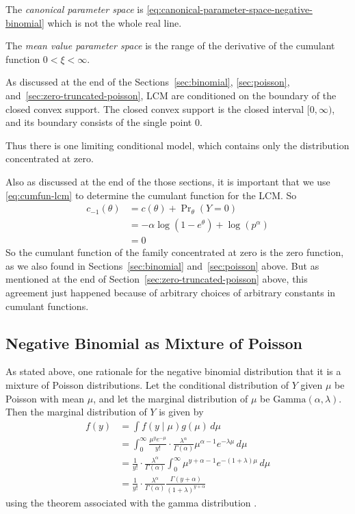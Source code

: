 The \emph{canonical parameter space}
is \eqref{eq:canonical-parameter-space-negative-binomial}
which is not the whole real line.

The \emph{mean value parameter space} is the range of the derivative of
the cumulant function $0 < \xi < \infty$.

As discussed at the end of the Sections~\ref{sec:binomial},
\ref{sec:poisson}, and~\ref{sec:zero-truncated-poisson}, LCM
are conditioned on the boundary of the closed convex support.
The closed convex support is the closed interval $[0, \infty)$, and its
boundary consists of the single point $0$.

Thus there is one limiting conditional model, which contains only
the distribution concentrated at zero.

Also as discussed at the end of the those sections,
it is important that we use \eqref{eq:cumfun-lcm} to determine the cumulant
function for the LCM.  So
\begin{align*}
   c_{- 1}(\theta)
   & =
   c(\theta) + \Pr\nolimits_\theta(Y = 0)
   \\
   & =
   - \alpha \log(1 - e^\theta)
   +
   \log \left(p^\alpha\right)
   \\
   & =
   0
\end{align*}
So the cumulant function of the family concentrated at zero is the zero
function, as we also found in Sections~\ref{sec:binomial} and~\ref{sec:poisson}
above.  But as mentioned at the end of Section~\ref{sec:zero-truncated-poisson}
above, this agreement just happened because of arbitrary choices of arbitrary
constants in cumulant functions.

\subsection{Negative Binomial as Mixture of Poisson}
\label{sec:mixture}

As stated above, one rationale for the negative binomial distribution
that it is a mixture of Poisson distributions.  Let the conditional
distribution of $Y$ given $\mu$ be Poisson with mean $\mu$,
and let the marginal distribution of $\mu$ be $\text{Gamma}(\alpha, \lambda)$.
Then the marginal distribution of $Y$ is given by
\begin{align*}
   f(y)
   & =
   \int f(y \mid \mu) g(\mu) \, d \mu
   \\
   & =
   \int_0^\infty \frac{\mu^y e^{- \mu}}{y!} \cdot
   \frac{\lambda^\alpha}{\Gamma(\alpha)} \mu^{\alpha - 1} e^{- \lambda \mu}
   \, d \mu
   \\
   & =
   \frac{1}{y!}
   \cdot
   \frac{\lambda^\alpha}{\Gamma(\alpha)}
   \int_0^\infty \mu^{y + \alpha - 1} e^{- (1 + \lambda) \mu}
   \, d \mu
   \\
   & =
   \frac{1}{y!}
   \cdot
   \frac{\lambda^\alpha}{\Gamma(\alpha)}
   \frac{\Gamma(y + \alpha)}{(1 + \lambda)^{y + \alpha}}
\end{align*}
using the theorem associated with the gamma distribution
\citep{brand-name-distributions}.

